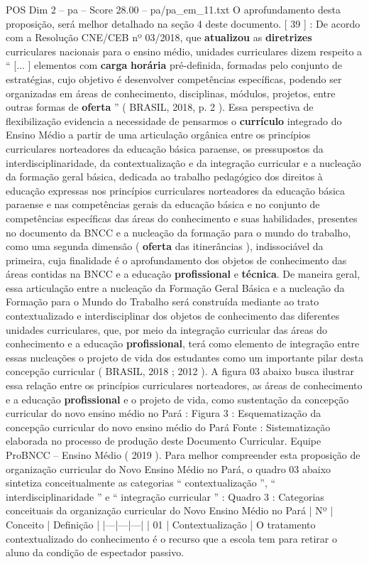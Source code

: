\begin{textsample}{POS Dim 2 – pa – Score 28.00 – pa/pa\_em\_11.txt}
O aprofundamento desta proposição, será melhor detalhado na seção 4 deste documento. [ 39 ] : De acordo com a Resolução CNE/CEB nº 03/2018, que \textbf{atualizou} as \textbf{diretrizes} curriculares nacionais para o ensino médio, unidades curriculares dizem respeito a “ [... ] elementos com \textbf{carga} \textbf{horária} pré-definida, formadas pelo conjunto de estratégias, cujo objetivo é desenvolver competências específicas, podendo ser organizadas em áreas de conhecimento, disciplinas, módulos, projetos, entre outras formas de \textbf{oferta} ” ( BRASIL, 2018, p. 2 ).
Essa perspectiva de flexibilização evidencia a necessidade de pensarmos o \textbf{currículo} integrado do Ensino Médio a partir de uma articulação orgânica entre os princípios curriculares norteadores da educação básica paraense, os pressupostos da interdisciplinaridade, da contextualização e da integração curricular e a nucleação da formação geral básica, dedicada ao trabalho pedagógico dos direitos à educação expressas nos princípios curriculares norteadores da educação básica paraense e nas competências gerais da educação básica e no conjunto de competências específicas das áreas do conhecimento e suas habilidades, presentes no documento da BNCC e a nucleação da formação para o mundo do trabalho, como uma segunda dimensão ( \textbf{oferta} das itinerâncias ), indissociável da primeira, cuja finalidade é o aprofundamento dos objetos de conhecimento das áreas contidas na BNCC e a educação \textbf{profissional} e \textbf{técnica}.
De maneira geral, essa articulação entre a nucleação da Formação Geral Básica e a nucleação da Formação para o Mundo do Trabalho será construída mediante ao trato contextualizado e interdisciplinar dos objetos de conhecimento das diferentes unidades curriculares, que, por meio da integração curricular das áreas do conhecimento e a educação \textbf{profissional}, terá como elemento de integração entre essas nucleações o projeto de vida dos estudantes como um importante pilar desta concepção curricular ( BRASIL, 2018 ; 2012 ).
A figura 03 abaixo busca ilustrar essa relação entre os princípios curriculares norteadores, as áreas de conhecimento e a educação \textbf{profissional} e o projeto de vida, como sustentação da concepção curricular do novo ensino médio no Pará : Figura 3 : Esquematização da concepção curricular do novo ensino médio do Pará Fonte : Sistematização elaborada no processo de produção deste Documento Curricular.
Equipe ProBNCC – Ensino Médio ( 2019 ).
Para melhor compreender esta proposição de organização curricular do Novo Ensino Médio no Pará, o quadro 03 abaixo sintetiza conceitualmente as categorias “ contextualização ”, “ interdisciplinaridade ” e “ integração curricular ” : Quadro 3 : Categorias conceituais da organização curricular do Novo Ensino Médio no Pará | Nº | Conceito | Definição | |---|---|---| | 01 | Contextualização | O tratamento contextualizado do conhecimento é o recurso que a escola tem para retirar o aluno da condição de espectador passivo.

\end{textsample}
